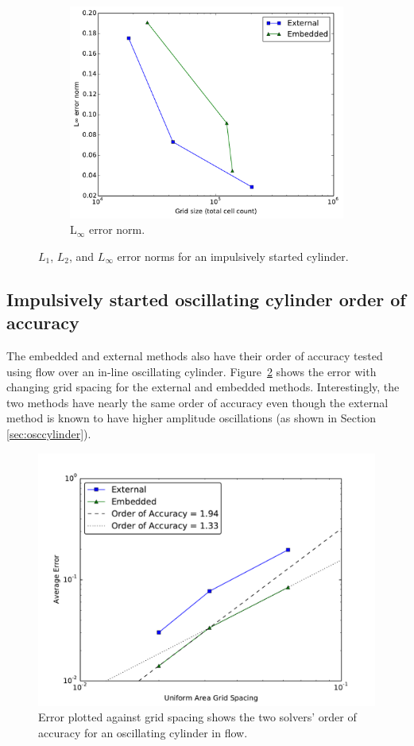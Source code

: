 \documentclass[preprint,12pt]{elsarticle}
\begin{document}
\begin{figure}[H]
	\begin{subfigure}{0.5\textwidth}
		\includegraphics[width=\linewidth]{Linf_error_norm}
		\caption{L$_\infty$ error norm.}
	\end{subfigure}
	\caption{$L_1$, $L_2$, and $L_\infty$ error norms for an impulsively started cylinder.}
	\label{fig:error norm}
\end{figure}

\subsection{Impulsively started oscillating cylinder order of accuracy}
The embedded and external methods also have their order of accuracy tested using flow over an in-line oscillating cylinder.  
Figure~\ref{fig:oscerror} shows the error with changing grid spacing for the external and embedded methods. 
Interestingly, the two methods have nearly the same order of accuracy even though the external method is known to have higher amplitude oscillations (as shown in Section \ref{sec:osccylinder}). 

\begin{figure}[!htb]
	\centering
	\par\medskip
	\includegraphics[width=0.6\linewidth]{error_oscflow}
	\caption{Error plotted against grid spacing shows the two solvers' order of accuracy for an oscillating cylinder in flow.}
	\label{fig:oscerror}
\end{figure}
\end{document}

